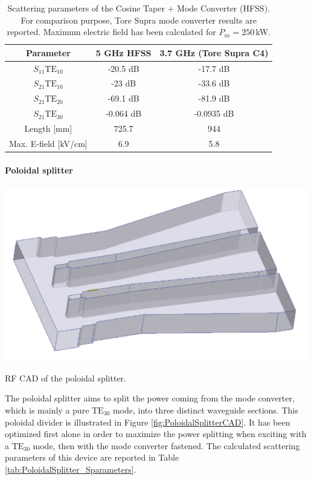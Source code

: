 {\begin{table}[h]
	\begin{centering}
		\begin{tabular}{|c|c|c|}
			\hline 
			Parameter & \multicolumn{1}{c|}{5 GHz HFSS } & 3.7 GHz (Tore Supra C4) \tabularnewline
			\hline 
			\hline 
			$S_{11}$$\mbox{TE}_{10}$  & -20.5 dB  & -17.7 dB\tabularnewline
			\hline 
			$S_{21}$$\mbox{TE}_{10}$ & -23 dB  & -33.6 dB\tabularnewline
			\hline 
			$S_{21}$$\mbox{TE}_{20}$ & -69.1 dB  & -81.9 dB\tabularnewline
			\hline 
			$S_{21}$$\mbox{TE}_{30}$ & -0.064 dB  & -0.0935 dB\tabularnewline
			\hline 
			Length {[}mm{]} & \multicolumn{1}{c|}{725.7} & 944\tabularnewline
			\hline 
			Max. E-field {[}kV/cm{]} & \multicolumn{1}{c|}{6.9 } & 5.8\tabularnewline
			\hline 
		\end{tabular}
		\par\end{centering}
	
	\caption{Scattering parameters of the Cosine Taper + Mode Converter (HFSS). For comparison purpose, Tore Supra mode converter results are reported. Maximum electric field has been calculated for $P_{in}=250$\,kW.\label{tab:S-ParametersALL}}
\end{table}


\paragraph{Poloidal splitter}
\begin{marginfigure}
	\includegraphics[width=1.0\textwidth]{figures/chap3/ITER_modeconverter/HFSS_PoloidalJunction}
	\caption{RF CAD of the poloidal splitter.}
	\label{fig:PoloidalSplitterCAD}
\end{marginfigure}
The poloidal splitter aims to split the power coming from the mode converter, which is mainly a pure $\mbox{TE}_{30}$ mode, into three distinct waveguide sections. This poloidal divider is illustrated in Figure \ref{fig:PoloidalSplitterCAD}. It has been optimized first alone in order to maximize the power splitting when exciting with a $\mbox{TE}_{30}$ mode, then with the mode converter fastened. The calculated scattering parameters of this device are reported in Table \ref{tab:PoloidalSplitter_Sparameters}.

}
